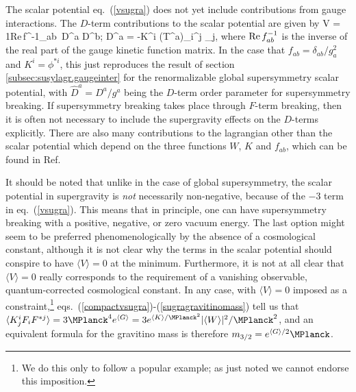 The scalar potential
eq.~(\ref{vsugra}) does not yet include contributions from gauge
interactions. The
$D$-term contributions to the scalar potential are given by
\beq
V = {1}{\rm Re}\,f^{-1}_{ab}\, {\widehat D}^a
{\widehat D}^b;\qquad\>\>\> {\widehat D}^a = -K^i
(T^a)_i^j \phi_j,\qquad\>\>{}
\eeq
where ${\rm Re}\,f^{-1}_{ab}$ is the inverse of the real part of the
gauge kinetic function matrix. In the case that $f_{ab} =
\delta_{ab}/g_a^2$ and
$K^i = \phi^{*i}$, this just reproduces the result of section
\ref{subsec:susylagr.gaugeinter} for the renormalizable
global supersymmetry scalar potential, with $\widehat{D}^a = D^a/g^a$
being the
$D$-term order parameter for supersymmetry breaking.
If supersymmetry breaking takes place through $F$-term breaking,
then it is often not necessary to include the supergravity effects on the
$D$-terms
explicitly. There are also many contributions to the lagrangian
other than the scalar potential which depend on the three functions
$W$, $K$ and $f_{ab}$, which can be found in Ref.\cite{supergravity2}

It should be noted that unlike in the case of global supersymmetry, the
scalar potential in supergravity is {\it not}
necessarily non-negative, because of the $-3$ term in
eq.~(\ref{vsugra}). This means that in principle, one can have
supersymmetry breaking with a positive, negative, or zero vacuum energy.
The last option might seem to be preferred phenomenologically by the
absence of a cosmological constant, although it is not clear why
the terms in the scalar potential should conspire to
have $\langle V \rangle = 0$ at the minimum. Furthermore, it
is not at all clear that $\langle V
\rangle = 0$ really corresponds to
the requirement of a vanishing observable, quantum-corrected cosmological
constant.\cite{cosmock}
In any case, with $\langle V \rangle = 0$ imposed as a
constraint,\footnote{We do this only to follow a popular example; as just
noted we cannot endorse this imposition.}
eqs.~(\ref{compactvsugra})-(\ref{sugragravitinomass}) tell us that
$ \langle K_j^i F_i F^{*j} \rangle = 3 \MPlanck^4 e^{\langle G \rangle}
=
3 e^{\langle K \rangle/\MPlanck^2} |\langle W \rangle|^2/\MPlanck^2$,
and an equivalent formula for the gravitino mass is therefore
$m_{3/2} = e^{\langle G\rangle/2} \MPlanck$.

